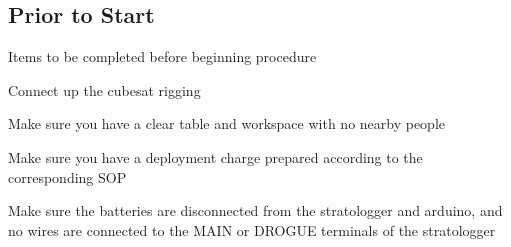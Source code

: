 \subsection{Prior to Start}
\begin{checklist}
    \item Items to be completed before beginning procedure
    \begin{checklist}
        \item Connect up the cubesat rigging
        \item Make sure you have a clear table and workspace with no nearby people
	\item Make sure you have a deployment charge prepared according to the corresponding SOP
        \item Make sure the batteries are disconnected from the stratologger and arduino, and no wires are connected to the MAIN or DROGUE terminals of the stratologger
    \end{checklist}
\end{checklist}
\setcounter{checklistnum}{0}

\newpage
